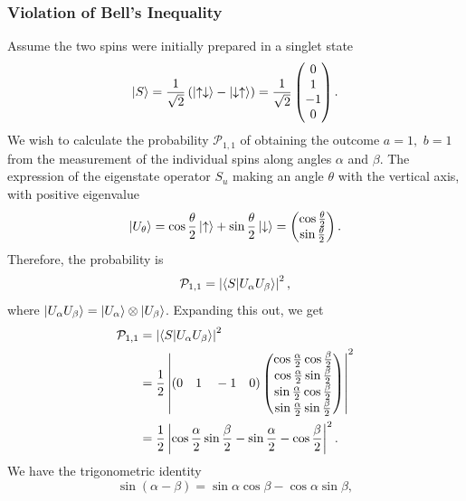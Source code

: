 \documentclass{article}
\begin{document}
\subsubsection{Violation of Bell's Inequality}
Assume the two spins were initially prepared in a singlet state
\[
    \ket{S}=\frac{1}{\sqrt{2}}\left( \ket{\uparrow \downarrow}-\ket{\downarrow \uparrow} \right)=\frac{1}{\sqrt{2}}\begin{pmatrix}
        0\\1\\-1\\0
    \end{pmatrix}.
\]
We wish to calculate the probability $\mathcal{P}_{1,1}$ of obtaining the outcome $a=1,$ $b=1$ from the measurement of the individual spins along angles $\alpha $ and $\beta $. The expression of the eigenstate operator $S_u$ making an angle $\theta $ with the vertical axis, with positive eigenvalue
\[
    \ket{U_{\theta }}=\cos \frac{\theta }{2}\ket{\uparrow}+\sin \frac{\theta }{2}\ket{\downarrow}=\begin{pmatrix}
        \cos \frac{\theta }{2}\\ \sin \frac{\theta }{2}
    \end{pmatrix}.
\]
Therefore, the probability is
\[
    \mathcal{P}_{1,1}=\left| \braket{S}{U_\alpha U_\beta } \right|^2,
\]
where $\ket{U_\alpha U_\beta }=\ket{U_\alpha }\otimes \ket{U_\beta }$. Expanding this out, we get
\begin{align*}
    \mathcal{P}_{1,1} &= \left| \braket{S}{U_\alpha U_\beta } \right|^2\\
                      &= \frac{1}{2} \left| (0\quad 1\quad-1\quad 0)\begin{pmatrix}
                          \cos \frac{\alpha }{2}\cos \frac{\beta }{2}\\
                          \cos \frac{\alpha }{2}\sin \frac{\beta }{2} \\
                          \sin \frac{\alpha }{2}\cos \frac{\beta }{2}\\
                          \sin \frac{\alpha }{2}\sin \frac{\beta }{2}
                      \end{pmatrix}\right|^2 \\
                      &=\frac{1}{2}\left| \cos \frac{\alpha }{2}\sin \frac{\beta }{2}-\sin \frac{\alpha }{2}-\cos \frac{\beta }{2} \right|^2.
\end{align*}
We have the trigonometric identity
\[
    \sin(\alpha -\beta )=\sin\alpha \cos\beta -\cos\alpha \sin\beta ,
\]
\end{document}
